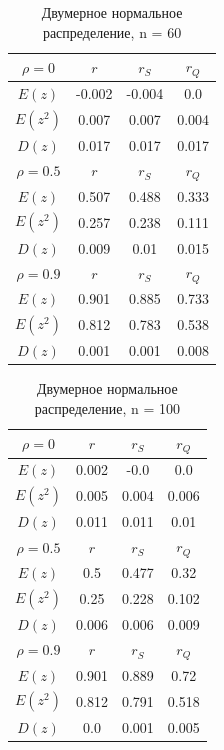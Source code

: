 \documentclass[main.tex]{subfiles}
\begin{document}
\begin{table}[ht]
	\centering
	\begin{tabular}{| c | c | c | c |}
		
		\hline
		$\rho = 0$ & $r$      & $r_S$  & $r_Q$ \\
		\hline
		$E(z)$     & -0.002 & -0.004 & 0.0   \\
		$E(z^2)$  & 0.007  & 0.007  & 0.004 \\
		$D(z)$    & 0.017  & 0.017  & 0.017 \\
		\hline
		$\rho = 0.5$ & $r$      & $r_S$  & $r_Q$ \\
		\hline
		$E(z)$       & 0.507 & 0.488 & 0.333 \\
		$E(z^2)$    & 0.257 & 0.238 & 0.111 \\
		$D(z)$      & 0.009 & 0.01  & 0.015 \\
		\hline
		$\rho = 0.9$ & $r$      & $r_S$  & $r_Q$ \\
		\hline
		$E(z)$       & 0.901 & 0.885 & 0.733 \\
		$E(z^2)$    & 0.812 & 0.783 & 0.538 \\
		$D(z)$      & 0.001 & 0.001 & 0.008 \\
		\hline
		
	\end{tabular}{}
	\caption{Двумерное нормальное распределение, n = 60}
	\label{tab:n60}
\end{table}



\begin{table}[ht]
	\centering
	\begin{tabular}{| c | c | c | c |}
		
		\hline
		$\rho = 0$ & $r$      & $r_S$  & $r_Q$ \\
		\hline
		$E(z)$     & 0.002 & -0.0  & 0.0   \\
		$E(z^2)$  & 0.005 & 0.004 & 0.006 \\
		$D(z)$    & 0.011 & 0.011 & 0.01  \\
		\hline
		$\rho = 0.5$ & $r$      & $r_S$  & $r_Q$ \\
		\hline
		$E(z)$       & 0.5   & 0.477 & 0.32  \\
		$E(z^2)$    & 0.25  & 0.228 & 0.102 \\
		$D(z)$     & 0.006 & 0.006 & 0.009 \\
		\hline
		$\rho = 0.9$ & $r$      & $r_S$  & $r_Q$ \\
		\hline
		$E(z)$       & 0.901 & 0.889 & 0.72  \\
		$E(z^2)$    & 0.812 & 0.791 & 0.518 \\
		$D(z)$      & 0.0   & 0.001 & 0.005 \\
		\hline
		
	\end{tabular}{}
	\caption{Двумерное нормальное распределение, n = 100}
	\label{tab:n100}
\end{table}
\end{document}
